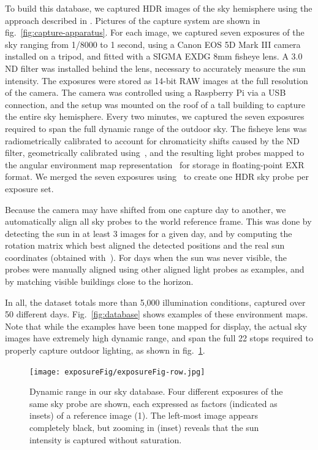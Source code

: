 To build this database, we captured HDR images of the sky hemisphere using the approach described in \cite{stumpfel-afrigraph-04}. Pictures of the capture system are shown in fig.~\ref{fig:capture-apparatus}. For each image, we captured seven exposures of the sky ranging from 1/8000 to 1 second, using a Canon EOS 5D Mark III camera installed on a tripod, and fitted with a SIGMA EXDG 8mm fisheye lens. A 3.0 ND filter was installed behind the lens, necessary to accurately measure the sun intensity. The exposures were stored as 14-bit RAW images at the full resolution of the camera. The camera was controlled using a Raspberry Pi via a USB connection, and the setup was mounted on the roof of a tall building to capture the entire sky hemisphere. Every two minutes, we captured the seven exposures required to span the full dynamic range of the outdoor sky. The fisheye lens was radiometrically calibrated to account for chromaticity shifts caused by the ND filter, geometrically calibrated using~\cite{scaramuzza-iros-06}, and the resulting light probes mapped to the angular environment map representation~\cite{reinhard-book-05} for storage in floating-point EXR format. We merged the seven exposures using~\cite{debevec-siggraph-97} to create one HDR sky probe per exposure set.

Because the camera may have shifted from one capture day to another, we automatically align all sky probes to the world reference frame. This was done by detecting the sun in at least 3 images for a given day, and by computing the rotation matrix which best aligned the detected positions and the real sun coordinates (obtained with~\cite{reda-se-04}). For days when the sun was never visible, the probes were manually aligned using other aligned light probes as examples, and by matching visible buildings close to the horizon.

In all, the dataset totals more than 5,000 illumination conditions, captured over 50 different days. Fig.~\ref{fig:database} shows examples of these environment maps. Note that while the examples have been tone mapped for display, the actual sky images have extremely high dynamic range, and span the full 22 stops required to properly capture outdoor lighting, as shown in fig.~\ref{fig:exposure}.

\begin{figure}
\centering
\texttt{[image: exposureFig/exposureFig-row.jpg]}
\caption[Sky Database]{Dynamic range in our sky database. Four different exposures of the same sky probe are shown, each expressed as factors (indicated as insets) of a reference image (1). The left-most image appears completely black, but zooming in (inset) reveals that the sun intensity is captured without saturation.}
\label{fig:exposure}
\end{figure}



